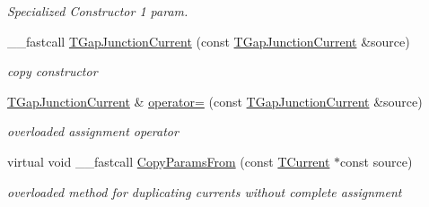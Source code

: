 \begin{DoxyCompactItemize}
\begin{DoxyCompactList}\small\item\em Specialized Constructor 1 param. \end{DoxyCompactList}\item 
\hypertarget{class_t_gap_junction_current_affe7bbea52d44aa0b6b9bc39df1dcfac}{\+\_\+\+\_\+fastcall \hyperlink{class_t_gap_junction_current_affe7bbea52d44aa0b6b9bc39df1dcfac}{T\+Gap\+Junction\+Current} (const \hyperlink{class_t_gap_junction_current}{T\+Gap\+Junction\+Current} \&source)}\label{class_t_gap_junction_current_affe7bbea52d44aa0b6b9bc39df1dcfac}

\begin{DoxyCompactList}\small\item\em copy constructor \end{DoxyCompactList}\item 
\hypertarget{class_t_gap_junction_current_ac2de0534921e92e81b188fca317f01a4}{\hyperlink{class_t_gap_junction_current}{T\+Gap\+Junction\+Current} \& \hyperlink{class_t_gap_junction_current_ac2de0534921e92e81b188fca317f01a4}{operator=} (const \hyperlink{class_t_gap_junction_current}{T\+Gap\+Junction\+Current} \&source)}\label{class_t_gap_junction_current_ac2de0534921e92e81b188fca317f01a4}

\begin{DoxyCompactList}\small\item\em overloaded assignment operator \end{DoxyCompactList}\item 
\hypertarget{class_t_gap_junction_current_a238e55936013f301a51b163678c18651}{virtual void \+\_\+\+\_\+fastcall \hyperlink{class_t_gap_junction_current_a238e55936013f301a51b163678c18651}{Copy\+Params\+From} (const \hyperlink{class_t_current}{T\+Current} $\ast$const source)}\label{class_t_gap_junction_current_a238e55936013f301a51b163678c18651}

\begin{DoxyCompactList}\small\item\em overloaded method for duplicating currents without complete assignment \end{DoxyCompactList}\end{DoxyCompactItemize}
